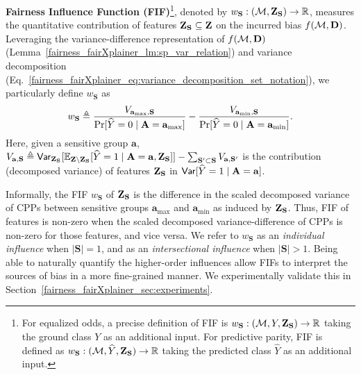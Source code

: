 \begin{definition} \textbf{Fairness Influence Function (FIF)}\footnote{For equalized odds, a precise definition of FIF is $ w_{\mathbf{S}}: (\mathcal{M}, Y, \mathbf{Z}_{\mathbf{S}}) \rightarrow \mathbb{R} $ taking the ground class $ Y $ as an additional input. For predictive parity, FIF is defined as $ w_{\mathbf{S}}: (\mathcal{M}, \widehat{Y}, \mathbf{Z}_{\mathbf{S}}) \rightarrow \mathbb{R} $ taking the predicted class $ \widehat{Y} $ as an additional input.}, denoted by $ w_{\mathbf{S}}: (\mathcal{M}, \mathbf{Z}_{\mathbf{S}}) \rightarrow \mathbb{R} $, measures the quantitative contribution of features $ \mathbf{Z}_{\mathbf{S}} \subseteq \mathbf{Z} $ on the incurred bias $ f(\mathcal{M}, \mathbf{D}) $. Leveraging the variance-difference representation of $ f(\mathcal{M}, \mathbf{D}) $ (Lemma~\ref{fairness_fairXplainer_lm:sp_var_relation}) and variance decomposition (Eq.~\eqref{fairness_fairXplainer_eq:variance_decomposition_set_notation}), we particularly define $ w_{\mathbf{S}} $ as
\begin{equation}\label{fairness_fairXplainer_eq:fif_decompose}
	w_{\mathbf{S}}  \triangleq \frac{V_{\mathbf{a}_{\max}, \mathbf{S}}}{ \Pr[\widehat{Y} = 0 \mid  \mathbf{A} = \mathbf{a}_{\max}]} - \frac{V_{\mathbf{a}_{\min}, \mathbf{S}} }{\Pr[\widehat{Y} = 0 \mid  \mathbf{A} = \mathbf{a}_{\min}]}.
\end{equation}
Here, given a sensitive group $ \mathbf{a} $, $ V_{\mathbf{a}, \mathbf{S}} \triangleq  \mathsf{Var} _{\mathbf{Z}_{\mathbf{S}}}[\mathbb{E}_{\mathbf{Z}\setminus\mathbf{Z}_{\mathbf{S}}}[\widehat{Y} = 1\mid \mathbf{A} = \mathbf{a}, \mathbf{Z}_{\mathbf{S}}]]- \sum_{\mathbf{S}' \subset \mathbf{S}}{V} _{\mathbf{a}, \mathbf{S}'} $ is the contribution (decomposed variance) of features $ \mathbf{Z}_{\mathbf{S}} $ in $ \mathsf{Var}[\widehat{Y} = 1\mid\mathbf{A} = \mathbf{a}] $.
\end{definition}	

Informally, the FIF $ w_{\mathbf{S}} $ of $ \mathbf{Z}_{\mathbf{S}} $ is the difference in the scaled decomposed variance of CPPs between sensitive groups $ \mathbf{a}_{\max} $ and $ \mathbf{a}_{\min} $ as induced by  $ \mathbf{Z}_{\mathbf{S}} $. Thus, FIF of features is non-zero when the scaled decomposed variance-difference of CPPs is non-zero for those features, and vice versa. We refer to $ w_{\mathbf{S}} $ as an \emph{individual influence} when $ |\mathbf{S}| = 1 $, and as an \emph{intersectional influence} when $ |\mathbf{S}| > 1 $. Being able to naturally quantify the higher-order influences allow FIFs to interpret the sources of bias in a more fine-grained manner. We experimentally validate this in Section~\ref{fairness_fairXplainer_sec:experiments}.
 

